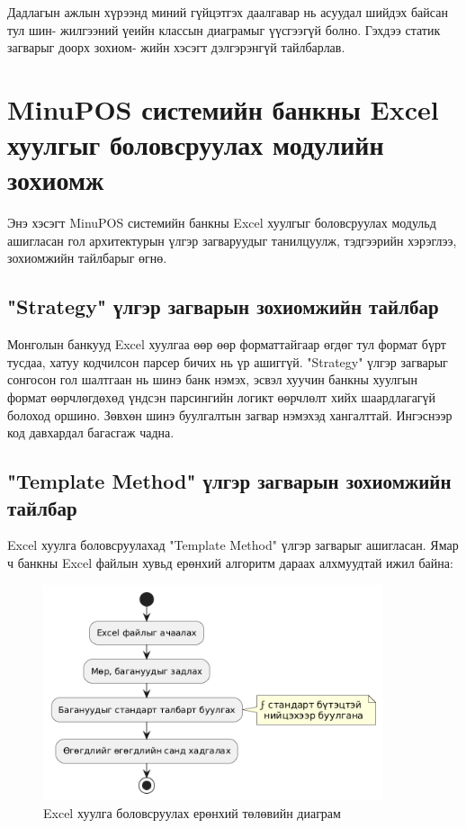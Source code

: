 Дадлагын ажлын хүрээнд миний гүйцэтгэх даалгавар нь асуудал шийдэх байсан тул шин- жилгээний үеийн классын диаграмыг үүсгээгүй болно. Гэхдээ статик загварыг доорх зохиом- жийн хэсэгт дэлгэрэнгүй тайлбарлав.

\newpage
\section{MinuPOS системийн банкны Excel хуулгыг боловсруулах модулийн зохиомж}
Энэ хэсэгт MinuPOS системийн банкны Excel хуулгыг боловсруулах модульд ашигласан гол архитектурын үлгэр загваруудыг танилцуулж, тэдгээрийн хэрэглээ, зохиомжийн тайлбарыг өгнө.

\subsection{"Strategy" үлгэр загварын зохиомжийн тайлбар}
Монголын банкууд Excel хуулгаа өөр өөр форматтайгаар өгдөг тул формат бүрт тусдаа, хатуу кодчилсон парсер бичих нь үр ашиггүй. "Strategy" үлгэр загварыг сонгосон гол шалтгаан нь шинэ банк нэмэх, эсвэл хуучин банкны хуулгын формат өөрчлөгдөхөд үндсэн парсингийн логикт өөрчлөлт хийх шаардлагагүй болоход оршино. Зөвхөн шинэ буулгалтын загвар нэмэхэд хангалттай. Ингэснээр код давхардал багасгаж чадна.

\subsection{"Template Method" үлгэр загварын зохиомжийн тайлбар}
Excel хуулга боловсруулахад "Template Method" үлгэр загварыг ашигласан. Ямар ч банкны Excel файлын хувьд ерөнхий алгоритм дараах алхмуудтай ижил байна:

\begin{figure}[h]
		\centering
		\includegraphics[width=10cm]{images/state.png}
		\caption{Excel хуулга боловсруулах ерөнхий төлөвийн диаграм}
		\label{fig:state}
\end{figure}

